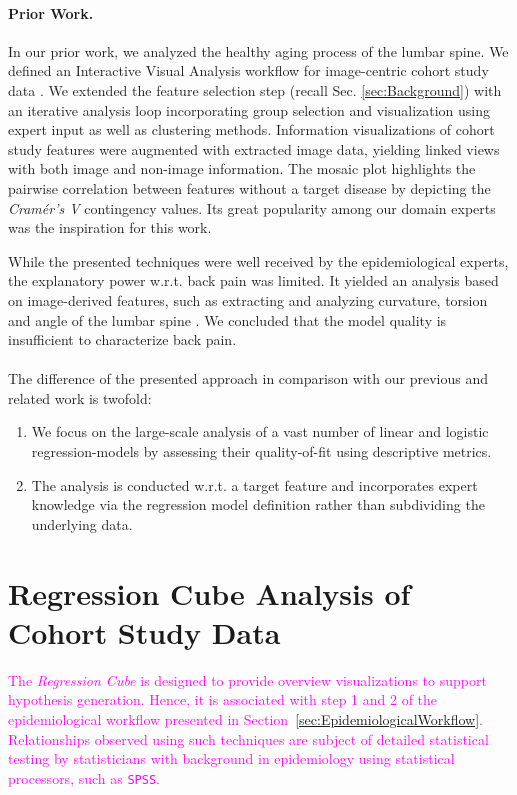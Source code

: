 \documentclass[journal]{style/vgtc} 			          %
\newcommand{\design}[1]{\textcolor{orange}{#1}}
\newcommand{\magenta}[1]{\textcolor{magenta}{#1}}
\begin{document}
\paragraph{Prior Work.}
In our prior work, we analyzed the healthy aging process of the lumbar spine.
We defined an Interactive Visual Analysis workflow for image-centric cohort study data \cite{Klemm2014VIS}. 
We extended the feature selection step (recall Sec. \ref{sec:Background}) with an iterative analysis loop incorporating group selection and visualization using expert input as well as clustering methods.
Information visualizations of cohort study features were augmented with extracted image data, yielding linked views with both image and non-image information.
The mosaic plot \cite{Klemm2014VIS} highlights the pairwise correlation between features without a target disease by depicting the \emph{Cram\'{e}r's V} contingency values.
Its great popularity among our domain experts was the inspiration for this work.

While the presented techniques were well received by the epidemiological experts, the explanatory power w.r.t. back pain was limited.
It yielded an analysis based on image-derived features, such as extracting and analyzing curvature, torsion and angle of the lumbar spine \cite{Klemm2015}.
We concluded that the model quality is insufficient to characterize back pain.
\\\\
The difference of the presented approach in comparison with our previous and related work is twofold:
\begin{enumerate}
	\item We focus on the large-scale analysis of a vast number of linear and logistic regression-models by assessing their quality-of-fit using descriptive metrics.
	\item The analysis is conducted w.r.t. a target feature and incorporates expert knowledge via the regression model definition rather than subdividing the underlying data.
\end{enumerate}
\section{Regression Cube Analysis of Cohort Study Data}
\magenta{
The \emph{Regression Cube} is designed to provide overview visualizations to support hypothesis generation.
Hence, it is associated with step 1 and 2 of the epidemiological workflow presented in Section~\ref{sec:EpidemiologicalWorkflow}.
Relationships observed using such techniques are subject of detailed statistical testing by statisticians with background in epidemiology using statistical processors, such as \texttt{SPSS}.
}
\end{document}

